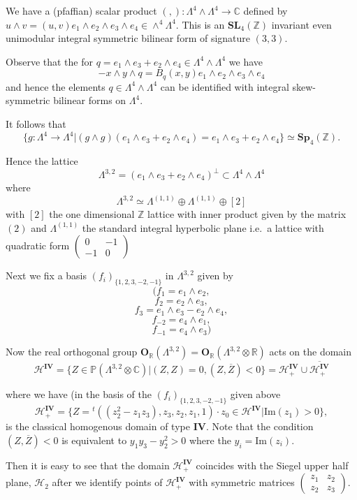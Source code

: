 \documentclass[9pt]{amsart} \usepackage[utf8]{inputenc}
\newcommand{\Imag}{\mathrm{Im}}
\newcommand{\Proj}{\mathbb{P}}
\newcommand{\Z}{\mathbb{Z}} \newcommand{\C}{\mathbb{C}}
\newcommand{\R}{\mathbb{R}} \newcommand{\La}{\Lambda}
\newcommand{\HypPlan}{\Lambda^{(1,1)}}
\newcommand{\Sp}{\mathbf{Sp}}
\newcommand{\SL}{\mathbf{SL}}
\newcommand{\Orth}{\mathbf{O}}
\newcommand{\Hpl}{\mathcal{H}}
\newcommand{\IV}{\mathbf{IV}}
\newcommand{\fbasis}{(f_i)_{\{1,2,3,-2,-1\}}}
\begin{document}
We have a (pfaffian) scalar product
$(,): \La^4 \wedge \La^4 \rightarrow \C$ defined by $u \wedge v =
(u,v)e_1 \wedge e_2 \wedge e_3 \wedge e_4 \in \wedge^4 \La^4$.  This is
an $\SL_4(\Z)$ invariant even unimodular integral symmetric bilinear
form of signature $(3,3)$.

Observe that the for $q = e_1\wedge e_3 + e_2 \wedge e_4 \in \La^4
\wedge \La^4$ we have $$-x \wedge y \wedge q = B_q(x,y) e_1 \wedge e_2
\wedge e_3 \wedge e_4$$ and hence the elements $q \in \La^4 \wedge
\La^4$ can be identified with integral skew-symmetric bilinear forms on
$\La^4$.


It follows that $$ \{ g : \La^4 \rightarrow \La^4 | (g \wedge g)(e_1
\wedge e_3 + e_2 \wedge e_4) = e_1 \wedge e_3 + e_2 \wedge e_4 \} \simeq
\Sp_4(\Z).$$

Hence the lattice $$\La^{3,2} = (e_1 \wedge e_3 + e_2 \wedge e_4)^{\perp}
\subset \La^4 \wedge \La^4$$ where $$\La^{3,2} \simeq \HypPlan \oplus \HypPlan \oplus [2]$$
with $[2]$ the one dimensional $\Z$ lattice with inner product given by
the matrix $(2)$ and $\HypPlan$ the standard integral hyperbolic plane i.e.\ a lattice with
quadratic form $\begin{pmatrix}0 & -1\\ -1 & 0\end{pmatrix}$

Next we fix a basis $\fbasis$ in $\La^{3,2}$ given by
$$ (f_1 = e_1 \wedge e_2,$$
$$ f_2 = e_2 \wedge e_3,$$
$$ f_3 = e_1 \wedge e_3 - e_2 \wedge e_4, $$
$$ f_{-2} = e_4 \wedge e_1, $$
$$ f_{-1} = e_4 \wedge e_3)$$

Now the real orthogonal group $\Orth_{\R}(\La^{3,2}) =
\Orth_{\R}(\La^{3,2}\otimes \R)$ acts on the domain $$\Hpl^{\IV} = \{ Z \in
\Proj(\La^{3,2} \otimes \C) | (Z,Z) = 0, (Z, \overline{Z}) < 0\} = \Hpl_+^{\IV}
\cup \overline{\Hpl^{\IV}_+}$$

where we have (in the basis of the $\fbasis$ given above
$$\Hpl_+^{\IV} = \{ Z = {}^t((z_2^2 - z_1 z_3), z_3, z_2, z_1, 1)\cdot z_0
\in \Hpl^{\IV} |\Imag(z_1) > 0 \},$$ is the classical homogenous domain
of type $\IV$. Note that the condition $(Z,\overline{Z})<0$ is equivalent to $y_1 y_3 -
y_2^2 > 0$ where the $y_i = \Imag(z_i)$.

Then it is easy to see that the domain $\Hpl_+^{\IV}$ coincides with the
Siegel upper half plane, $\Hpl_2$ after we identify points of
$\Hpl_+^{\IV}$ with symmetric matrices $\begin{pmatrix} z_1 & z_2\\ z_2 &
z_3\end{pmatrix}$.
\end{document}
